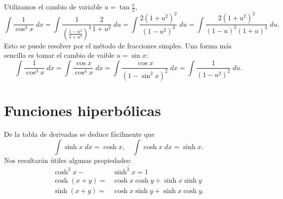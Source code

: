 \begin{eg}
\normalfont Utilizamos el cambio de variable $\displaystyle u = \tan \frac{x}{2} $,
\[\int \frac{1}{\cos^{3}x} \; dx = \int \frac{1}{\left(\frac{1-u^{2}}{1+u^{2}}\right)^{3}} \frac{2}{1+u^{2}}\; du = \int \frac{2\left(1+u^{2}\right)^{2}}{\left(1-u^{2}\right)^{3}} \; du = \int \frac{2\left(1+u^{2}\right)^{2}}{\left(1-u\right)^{3}\left(1+u\right)^{3}} \; du.\]
Esto se puede resolver por el método de fracciones simples. Una forma más sencilla es tomar el cambio de vaible $\displaystyle u = \sin x $:
\[\int \frac{1}{\cos^{3}x} \; dx = \int \frac{\cos x}{\cos^{4}x} \; dx = \int \frac{\cos x}{\left(1-\sin ^{2}x\right)^{2}} \; dx = \int \frac{1}{\left(1-u^{2}\right)^{2}} \; du .\]
\end{eg}
\section{Funciones hiperbólicas}
De la tabla de derivadas se deduce fácilmente que
\[\int \sinh x \; dx = \cosh x, \quad \int \cosh x \; dx = \sinh x .\]
Nos resultarán útiles algunas propiedades:
\[ .\]
\[
\begin{split}
	\cosh^{2}x - & \sinh^{2}x = 1 \\
 \cosh\left(x+y\right) = & \cosh x \cosh y + \sinh x \sinh y \\
 \sinh\left(x+y\right) = & \cosh x\sinh y + \sinh x \cosh y.
\end{split}
\]

